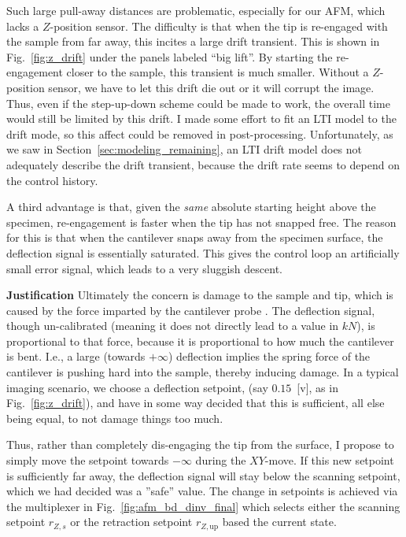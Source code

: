 \documentclass[twocolumn,twoside]{IEEEtran/IEEEtran}
\begin{document}
Such large pull-away distances are problematic, especially for our AFM, which
lacks a $Z$-position sensor. The difficulty is that when the tip is re-engaged
with the sample from far away, this incites a large drift transient. This is
shown in Fig.~\ref{fig:z_drift} under the panels labeled ``big lift''. By
starting the re-engagement closer to the sample, this transient is much smaller.
Without a $Z$-position sensor, we have to let this drift die out or it will
corrupt the image. Thus, even if the step-up-down scheme could be made to work,
the overall time would still be limited by this drift. I made some effort to fit
an LTI model to the drift mode, so this affect could be removed in
post-processing. Unfortunately, as we saw in
Section~\ref{sec:modeling_remaining}, an LTI drift model does not adequately
describe the drift transient, because the drift rate seems to depend on the
control history.

A third advantage is that, given the \emph{same} absolute starting height above
the specimen, re-engagement is faster when the tip has not snapped free. The
reason for this is that when the cantilever snaps away from the specimen
surface, the deflection signal is essentially saturated. This gives the control
loop an artificially small error signal, which leads to a very sluggish descent.


\textbf{Justification} Ultimately the concern is damage to the sample and tip,
which is caused by the force imparted by the cantilever probe
\cite{clayton_review_2009}. The deflection signal, though un-calibrated (meaning
it does not directly lead to a value in $kN$), is proportional to that force,
because it is proportional to how much the cantilever is bent. I.e., a large
(towards $+\infty$) deflection implies the spring force of the cantilever is
pushing hard into the sample, thereby inducing damage. In a typical imaging
scenario, we choose a deflection setpoint, (say $0.15$~[v], as in
Fig.~\ref{fig:z_drift}), and have in some way decided that this is sufficient,
all else being equal, to not damage things too much.

Thus, rather than completely dis-engaging the tip from the surface, I propose to
simply move the setpoint towards $-\infty$ during the $XY$-move. If this new
setpoint is sufficiently far away, the deflection signal will stay below the
scanning setpoint, which we had decided was a ''safe'' value. The change in
setpoints is achieved via the multiplexer in Fig.~\ref{fig:afm_bd_dinv_final}
which selects either the scanning setpoint $r_{Z,s}$ or the retraction setpoint
$r_{Z,\textrm{up}}$ based the current state.
\end{document}

